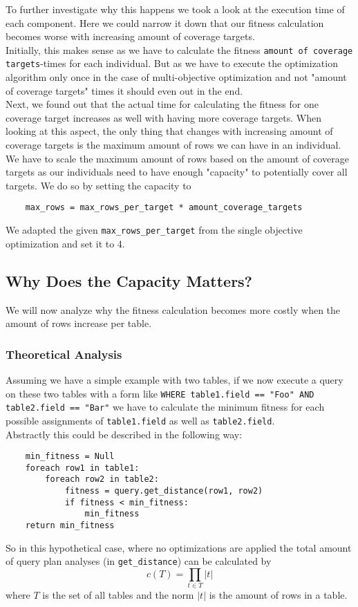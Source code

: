To further investigate why this happens we took a look at the execution time of each component. Here we could narrow it down that our fitness calculation becomes worse with increasing amount of coverage targets.\\
Initially, this makes sense as we have to calculate the fitness \verb|amount of coverage targets|-times for each individual. But as we have to execute the optimization algorithm only once in the case of multi-objective optimization and not "amount of coverage targets" times it should even out in the end.\\
Next, we found out that the actual time for calculating the fitness for one coverage target increases as well with having more coverage targets. When looking at this aspect, the only thing that changes with increasing amount of coverage targets is the maximum amount of rows we can have in an individual.\\
We have to scale the maximum amount of rows based on the amount of coverage targets as our individuals need to have enough "capacity" to potentially cover all targets. We do so by setting the capacity to
\begin{verbatim}
	max_rows = max_rows_per_target * amount_coverage_targets
\end{verbatim}
We adapted the given \verb|max_rows_per_target| from the single objective optimization and set it to 4.

\subsection{Why Does the Capacity Matters?}
\label{sec:why_capacity_matters}
We will now analyze why the fitness calculation becomes more costly when the amount of rows increase per table.

\subsubsection{Theoretical Analysis}

Assuming we have a simple example with two tables, if we now execute a query on these two tables with a form like \verb|WHERE table1.field == "Foo" AND table2.field == "Bar"| we have to calculate the minimum fitness for each possible assignments of \verb|table1.field| as well as \verb|table2.field|.\\
Abstractly this could be described in the following way:
\begin{verbatim}
    min_fitness = Null
    foreach row1 in table1:
        foreach row2 in table2:
            fitness = query.get_distance(row1, row2)
            if fitness < min_fitness:
                min_fitness
    return min_fitness
\end{verbatim}
So in this hypothetical case, where no optimizations are applied the total amount of query plan analyses (in \verb|get_distance|) can be calculated by
\begin{equation}
	\label{eqn:comparisons_for_fitness}
	c(T) = \prod_{t \in T} |t|
\end{equation}
where $T$ is the set of all tables and the norm $|t|$ is the amount of rows in a table.

